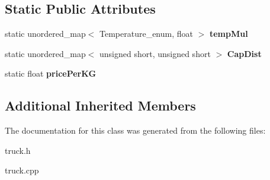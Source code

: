 \subsection*{Static Public Attributes}
\begin{DoxyCompactItemize}
\item 
\mbox{\label{class_congelation_aa0cf9fa825aa450ff04d58e5e733706b}} 
static unordered\+\_\+map$<$ Temperature\+\_\+enum, float $>$ {\bfseries temp\+Mul}
\item 
\mbox{\label{class_congelation_adc7b4cd8c64a3061ad4a4600f5e606c5}} 
static unordered\+\_\+map$<$ unsigned short, unsigned short $>$ {\bfseries Cap\+Dist}
\item 
\mbox{\label{class_congelation_ab30061aebb6a0fa59ec3f40e9de0ca34}} 
static float {\bfseries price\+Per\+KG}
\end{DoxyCompactItemize}
\subsection*{Additional Inherited Members}


The documentation for this class was generated from the following files\+:\begin{DoxyCompactItemize}
\item 
truck.\+h\item 
truck.\+cpp\end{DoxyCompactItemize}
